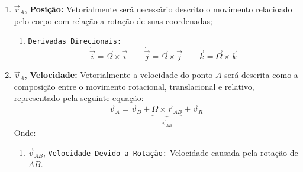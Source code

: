 \documentclass{article}
\begin{document}
                \begin{enumerate}[rightmargin = \leftmargin]
                    \item $\vec{r}_{A}$, \textbf{Posição:} Vetorialmente será necessário descrito o movimento relacioado pelo corpo com relação a rotação de suas coordenadas;
                        \begin{enumerate}[rightmargin = \leftmargin]
                            \item \texttt{Derivadas Direcionais:}
                                \begin{equation}
                                    \boxed{
                                        \dot{\vec{i}} = 
                                        \vec{\Omega}\times\vec{i}
                                    }
                                    \qquad
                                    \boxed{
                                        \dot{\vec{j}} = 
                                        \vec{\Omega}\times\vec{j}
                                    }
                                    \qquad
                                    \boxed{
                                        \dot{\vec{k}} = 
                                        \vec{\Omega}\times\vec{k}
                                    }
                                \end{equation}\noindent
                        \end{enumerate}

                    \item $\vec{v}_{A}$, \textbf{Velocidade:} Vetorialmente a velocidade do ponto $A$ será descrita como a composição entre o movimento rotacional,  translacional e relativo, representado pela seguinte equação:
                        \begin{equation}
                            \boxed{
                                \vec{v}_{A} = 
                                \vec{v}_{B} + 
                                \underbrace{
                                    \Omega\times\vec{r}_{AB}
                                }_{\vec{v}_{AB}} + 
                                \vec{v}_{R}
                            }
                        \end{equation}
                    Onde:
                        \begin{enumerate}[rightmargin = \leftmargin, noitemsep]
                            \item $\vec{v}_{AB}$, \texttt{Velocidade Devido a Rotação:} Velocidade causada pela rotação de $AB$.


\end{enumerate}
\end{enumerate}
\end{document}
